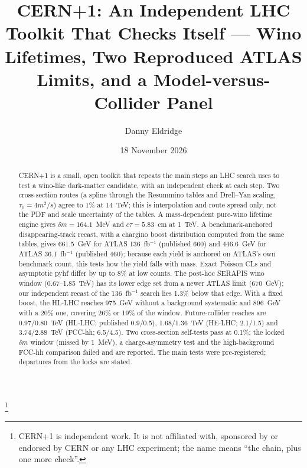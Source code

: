 \documentclass[aps,prd,twocolumn,superscriptaddress,nofootinbib,showkeys]{revtex4-2}
\begin{document}
\title{CERN+1: An Independent LHC Toolkit That Checks Itself --- Wino Lifetimes, Two Reproduced ATLAS Limits, and a Model-versus-Collider Panel}
\author{Danny Eldridge}
\thanks{CERN+1 is independent work. It is not affiliated with, sponsored by or endorsed by CERN or any LHC experiment; the name means ``the chain, plus one more check''.}
\date{18 November 2026}
\begin{abstract}
CERN+1 is a small, open toolkit that repeats the main steps an LHC search uses to test a wino-like dark-matter candidate, with an independent check at each step. Two cross-section routes (a spline through the Resummino tables and Drell--Yan scaling, $\tau_0=4m^2/s$) agree to 1\% at 14~TeV; this is interpolation and route spread only, not the PDF and scale uncertainty of the tables. A mass-dependent pure-wino lifetime engine gives $\delta m=164.1$~MeV and $c\tau=5.83$~cm at 1~TeV. A benchmark-anchored disappearing-track recast, with a chargino boost distribution computed from the same tables, gives 661.5~GeV for ATLAS 136~fb$^{-1}$ (published 660) and 446.6~GeV for ATLAS 36.1~fb$^{-1}$ (published 460); because each yield is anchored on ATLAS's own benchmark count, this tests how the yield falls with mass. Exact Poisson CLs and asymptotic pyhf differ by up to 8\% at low counts. The post-hoc SERAPIS wino window (0.67--1.85~TeV) has its lower edge set from a newer ATLAS limit (670~GeV); our independent recast of the 136~fb$^{-1}$ search lies 1.3\% below that edge. With a fixed boost, the HL-LHC reaches 975~GeV without a background systematic and 896~GeV with a 20\% one, covering 26\% or 19\% of the window. Future-collider reaches are 0.97/0.80~TeV (HL-LHC; published 0.9/0.5), 1.68/1.36~TeV (HE-LHC; 2.1/1.5) and 3.74/2.88~TeV (FCC-hh; 6.5/4.5). Two cross-section self-tests pass at 0.1\%; the locked $\delta m$ window (missed by 1~MeV), a charge-asymmetry test and the high-background FCC-hh comparison failed and are reported. The main tests were pre-registered; departures from the locks are stated.
\end{abstract}
\maketitle
\end{document}
